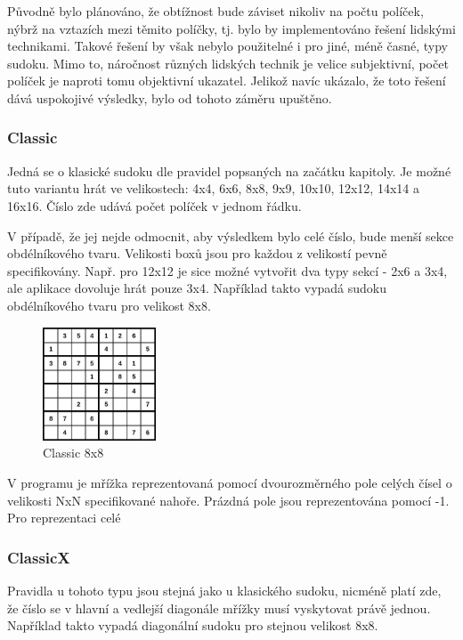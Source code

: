 \documentclass[a4paper,oneside,12pt]{report}
\begin{document}
Původně bylo plánováno, že obtížnost bude záviset nikoliv na počtu políček, nýbrž na vztazích mezi těmito políčky, tj. bylo by implementováno řešení lidskými technikami. Takové řešení by však nebylo použitelné i pro jiné, méně časné, typy sudoku. Mimo to, náročnost různých lidských technik je velice subjektivní, počet políček je naproti tomu objektivní ukazatel. Jelikož navíc ukázalo, že toto řešení dává uspokojivé výsledky, bylo od tohoto záměru upuštěno.

\subsubsection{Classic}
Jedná se o klasické sudoku dle pravidel popsaných na začátku kapitoly. Je možné tuto variantu hrát ve velikostech: 4x4, 6x6, 8x8, 9x9, 10x10, 12x12, 14x14 a 16x16. Číslo zde udává počet políček v jednom řádku.

V případě, že jej nejde odmocnit, aby výsledkem bylo celé číslo, bude menší sekce obdélníkového tvaru. Velikosti boxů jsou pro každou z velikostí pevně specifikovány. Např. pro 12x12 je sice možné vytvořit dva typy sekcí - 2x6 a 3x4, ale aplikace dovoluje hrát pouze 3x4. Například takto vypadá sudoku obdélníkového tvaru pro velikost 8x8.

\begin{figure}[H]
   \centering
   \includegraphics[width=0.3\textwidth]{../img/8x8sudoku.jpg}
   \caption[Strukura projektu]{Classic 8x8}
   \label{fig:8x8Sudoku}
\end{figure}

V programu je mřížka reprezentovaná pomocí dvourozměrného pole celých čísel o velikosti NxN specifikované nahoře. Prázdná pole jsou reprezentována pomocí -1. Pro reprezentaci celé

\subsubsection{ClassicX}
Pravidla u tohoto typu jsou stejná jako u klasického sudoku, nicméně platí zde, že číslo se v hlavní a vedlejší diagonále mřížky musí vyskytovat právě jednou. Například takto vypadá diagonální sudoku pro stejnou velikost 8x8.
\end{document}

